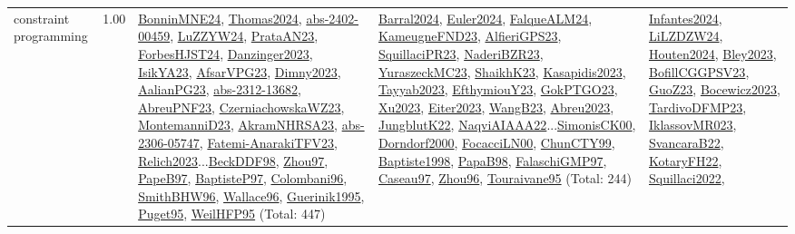 {\begin{longtable}{p{3cm}r>{\raggedright\arraybackslash}p{6cm}>{\raggedright\arraybackslash}p{6cm}>{\raggedright\arraybackslash}p{8cm}}
\index{constraint programming}\index{CP!constraint programming}constraint programming &  1.00 & \hyperref[detail:BonninMNE24]{BonninMNE24}, \hyperref[detail:Thomas2024]{Thomas2024}, \hyperref[detail:abs-2402-00459]{abs-2402-00459}, \hyperref[detail:LuZZYW24]{LuZZYW24}, \hyperref[detail:PrataAN23]{PrataAN23}, \hyperref[detail:ForbesHJST24]{ForbesHJST24}, \hyperref[detail:Danzinger2023]{Danzinger2023}, \hyperref[detail:IsikYA23]{IsikYA23}, \hyperref[detail:AfsarVPG23]{AfsarVPG23}, \hyperref[detail:Dimny2023]{Dimny2023}, \hyperref[detail:AalianPG23]{AalianPG23}, \hyperref[detail:abs-2312-13682]{abs-2312-13682}, \hyperref[detail:AbreuPNF23]{AbreuPNF23}, \hyperref[detail:CzerniachowskaWZ23]{CzerniachowskaWZ23}, \hyperref[detail:MontemanniD23]{MontemanniD23}, \hyperref[detail:AkramNHRSA23]{AkramNHRSA23}, \hyperref[detail:abs-2306-05747]{abs-2306-05747}, \hyperref[detail:Fatemi-AnarakiTFV23]{Fatemi-AnarakiTFV23}, \hyperref[detail:Relich2023]{Relich2023}...\hyperref[detail:BeckDDF98]{BeckDDF98}, \hyperref[detail:Zhou97]{Zhou97}, \hyperref[detail:PapeB97]{PapeB97}, \hyperref[detail:BaptisteP97]{BaptisteP97}, \hyperref[detail:Colombani96]{Colombani96}, \hyperref[detail:SmithBHW96]{SmithBHW96}, \hyperref[detail:Wallace96]{Wallace96}, \hyperref[detail:Guerinik1995]{Guerinik1995}, \hyperref[detail:Puget95]{Puget95}, \hyperref[detail:WeilHFP95]{WeilHFP95} (Total: 447) & \hyperref[detail:Barral2024]{Barral2024}, \hyperref[detail:Euler2024]{Euler2024}, \hyperref[detail:FalqueALM24]{FalqueALM24}, \hyperref[detail:KameugneFND23]{KameugneFND23}, \hyperref[detail:AlfieriGPS23]{AlfieriGPS23}, \hyperref[detail:SquillaciPR23]{SquillaciPR23}, \hyperref[detail:NaderiBZR23]{NaderiBZR23}, \hyperref[detail:YuraszeckMC23]{YuraszeckMC23}, \hyperref[detail:ShaikhK23]{ShaikhK23}, \hyperref[detail:Kasapidis2023]{Kasapidis2023}, \hyperref[detail:Tayyab2023]{Tayyab2023}, \hyperref[detail:EfthymiouY23]{EfthymiouY23}, \hyperref[detail:GokPTGO23]{GokPTGO23}, \hyperref[detail:Xu2023]{Xu2023}, \hyperref[detail:Eiter2023]{Eiter2023}, \hyperref[detail:WangB23]{WangB23}, \hyperref[detail:Abreu2023]{Abreu2023}, \hyperref[detail:JungblutK22]{JungblutK22}, \hyperref[detail:NaqviAIAAA22]{NaqviAIAAA22}...\hyperref[detail:SimonisCK00]{SimonisCK00}, \hyperref[detail:Dorndorf2000]{Dorndorf2000}, \hyperref[detail:FocacciLN00]{FocacciLN00}, \hyperref[detail:ChunCTY99]{ChunCTY99}, \hyperref[detail:Baptiste1998]{Baptiste1998}, \hyperref[detail:PapaB98]{PapaB98}, \hyperref[detail:FalaschiGMP97]{FalaschiGMP97}, \hyperref[detail:Caseau97]{Caseau97}, \hyperref[detail:Zhou96]{Zhou96}, \hyperref[detail:Touraivane95]{Touraivane95} (Total: 244) & \hyperref[detail:Infantes2024]{Infantes2024}, \hyperref[detail:LiLZDZW24]{LiLZDZW24}, \hyperref[detail:Houten2024]{Houten2024}, \hyperref[detail:Bley2023]{Bley2023}, \hyperref[detail:BofillCGGPSV23]{BofillCGGPSV23}, \hyperref[detail:GuoZ23]{GuoZ23}, \hyperref[detail:Bocewicz2023]{Bocewicz2023}, \hyperref[detail:TardivoDFMP23]{TardivoDFMP23}, \hyperref[detail:IklassovMR023]{IklassovMR023}, \hyperref[detail:SvancaraB22]{SvancaraB22}, \hyperref[detail:KotaryFH22]{KotaryFH22}, \hyperref[detail:Squillaci2022]{Squillaci2022}, 
\end{longtable}}
